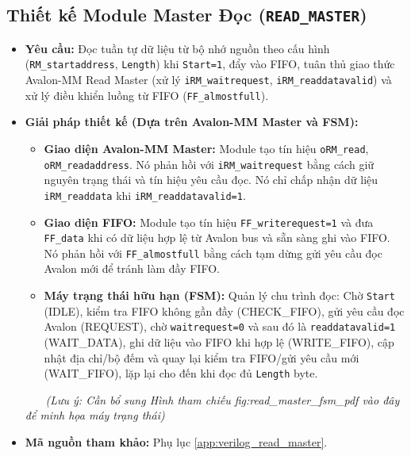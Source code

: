 \subsection{Thiết kế Module Master Đọc (\texttt{READ\_MASTER})}
\begin{itemize}
    \item \textbf{Yêu cầu:} Đọc tuần tự dữ liệu từ bộ nhớ nguồn theo cấu hình (\texttt{RM\_startaddress}, \texttt{Length}) khi \texttt{Start=1}, đẩy vào FIFO, tuân thủ giao thức Avalon-MM Read Master (xử lý \texttt{iRM\_waitrequest}, \texttt{iRM\_readdatavalid}) và xử lý điều khiển luồng từ FIFO (\texttt{FF\_almostfull}).
    \item \textbf{Giải pháp thiết kế (Dựa trên Avalon-MM Master và FSM):}
        \begin{itemize}
            \item \textbf{Giao diện Avalon-MM Master:} Module tạo tín hiệu \texttt{oRM\_read}, \texttt{oRM\_readaddress}. Nó phản hồi với \texttt{iRM\_waitrequest} bằng cách giữ nguyên trạng thái và tín hiệu yêu cầu đọc. Nó chỉ chấp nhận dữ liệu \texttt{iRM\_readdata} khi \texttt{iRM\_readdatavalid=1}.
            \item \textbf{Giao diện FIFO:} Module tạo tín hiệu \texttt{FF\_writerequest=1} và đưa \texttt{FF\_data} khi có dữ liệu hợp lệ từ Avalon bus và sẵn sàng ghi vào FIFO. Nó phản hồi với \texttt{FF\_almostfull} bằng cách tạm dừng gửi yêu cầu đọc Avalon mới để tránh làm đầy FIFO.
            \item \textbf{Máy trạng thái hữu hạn (FSM):} Quản lý chu trình đọc: Chờ \texttt{Start} (IDLE), kiểm tra FIFO không gần đầy (CHECK\_FIFO), gửi yêu cầu đọc Avalon (REQUEST), chờ \texttt{waitrequest=0} và sau đó là \texttt{readdatavalid=1} (WAIT\_DATA), ghi dữ liệu vào FIFO khi hợp lệ (WRITE\_FIFO), cập nhật địa chỉ/bộ đếm và quay lại kiểm tra FIFO/gửi yêu cầu mới (WAIT\_FIFO), lặp lại cho đến khi đọc đủ \texttt{Length} byte.
        \end{itemize}
\textit{(Lưu ý: Cần bổ sung Hình tham chiếu fig:read\_master\_fsm\_pdf vào đây để minh họa máy trạng thái)}
    \item \textbf{Mã nguồn tham khảo:} Phụ lục \ref{app:verilog_read_master}.
\end{itemize}


